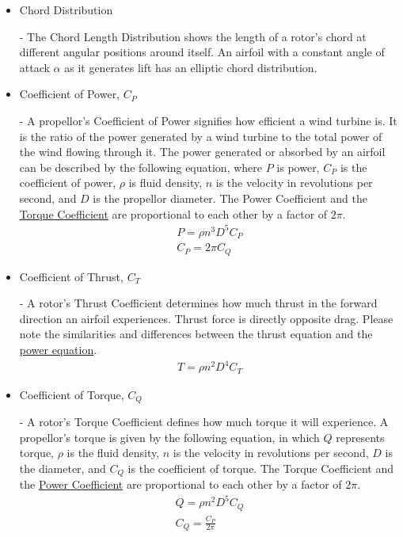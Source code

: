\documentclass{article}
\begin{document}
\begin{itemize}
	\item \hypertarget{c}{Chord Distribution} - The Chord Length Distribution shows the length of a rotor's chord at different angular positions around itself. An airfoil with a constant angle of attack $\alpha$ as it generates lift has an elliptic chord distribution.
	
	\item \hypertarget{CP}{Coefficient of Power, $C_{P}$} - A propellor's Coefficient of Power signifies how efficient a wind turbine is. It is the ratio of the power generated by a wind turbine to the total power of the wind flowing through it. The power generated or absorbed by an airfoil can be described by the following equation, where $P$ is power, $C_{P}$ is the coefficient of power, $\rho$ is fluid density, $n$ is the velocity in revolutions per second, and $D$ is the propellor diameter. The Power Coefficient and the \hyperlink{CT}{Torque Coefficient} are proportional to each other by a factor of $2\pi$.
	\begin{equation}
	\begin{aligned}
		P = \rho n^{3} D^{5} C_{P} \\
		C_{P} = 2 \pi C_{Q}
	\end{aligned}
	\end{equation}
	
	\item \hypertarget{CT}{Coefficient of Thrust, $C_{T}$} - A rotor's Thrust Coefficient determines how much thrust in the forward direction an airfoil experiences. Thrust force is directly opposite drag. Please note the similarities and differences between the thrust equation and the \hyperlink{CP}{power equation}.
	\begin{equation}
	\begin{aligned}
		T = \rho n^{2} D^{4} C_{T}
	\end{aligned}
	\end{equation}
	
	\item \hypertarget{CQ}{Coefficient of Torque, $C_{Q}$} - A rotor's Torque Coefficient defines how much torque it will experience. A propellor's torque is given by the following equation, in which $Q$ represents torque, $\rho$ is the fluid density, $n$ is the velocity in revolutions per second, $D$ is the diameter, and $C_{Q}$ is the coefficient of torque. The Torque Coefficient and the \hyperlink{CP}{Power Coefficient} are proportional to each other by a factor of $2\pi$.
	\begin{equation}
	\begin{aligned}
		Q = \rho n^{2} D^{5} C_{Q} \\
		C_{Q} = \frac{C_{P}}{2 \pi}
	\end{aligned}
	\end{equation}
	

\end{itemize}
\end{document}
